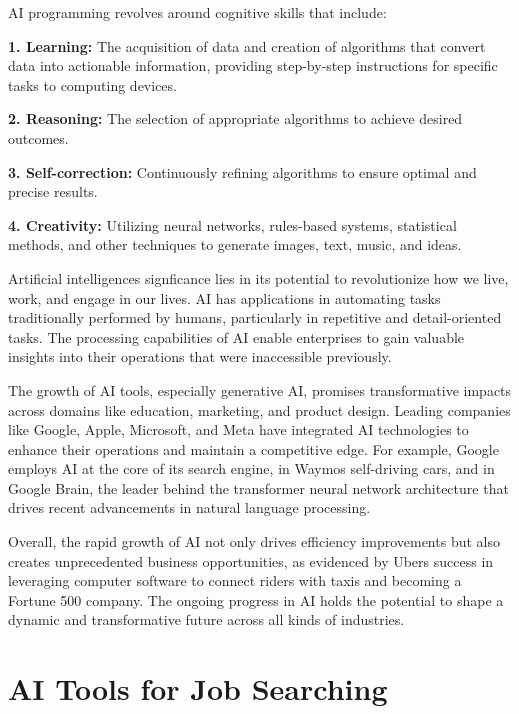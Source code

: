 \documentclass[
]{book}
\begin{document}
AI programming revolves around cognitive skills that include:

\textbf{1. Learning:} The acquisition of data and creation of algorithms that convert data into actionable information, providing step-by-step instructions for specific tasks to computing devices.

\textbf{2. Reasoning:} The selection of appropriate algorithms to achieve desired outcomes.

\textbf{3. Self-correction:} Continuously refining algorithms to ensure optimal and precise results.

\textbf{4. Creativity:} Utilizing neural networks, rules-based systems, statistical methods, and other techniques to generate images, text, music, and ideas.

Artificial intelligence\textquotesingle s signficance lies in its potential to revolutionize how we live, work, and engage in our lives. AI has applications in automating tasks traditionally performed by humans, particularly in repetitive and detail-oriented tasks. The processing capabilities of AI enable enterprises to gain valuable insights into their operations that were inaccessible previously.

The growth of AI tools, especially generative AI, promises transformative impacts across domains like education, marketing, and product design. Leading companies like Google, Apple, Microsoft, and Meta have integrated AI technologies to enhance their operations and maintain a competitive edge. For example, Google employs AI at the core of its search engine, in Waymo\textquotesingle s self-driving cars, and in Google Brain, the leader behind the transformer neural network architecture that drives recent advancements in natural language processing.

Overall, the rapid growth of AI not only drives efficiency improvements but also creates unprecedented business opportunities, as evidenced by Uber\textquotesingle s success in leveraging computer software to connect riders with taxis and becoming a Fortune 500 company. The ongoing progress in AI holds the potential to shape a dynamic and transformative future across all kinds of industries.

\hypertarget{ai-tools-for-job-searching}{%
\chapter{AI Tools for Job Searching}\label{ai-tools-for-job-searching}}
\end{document}
